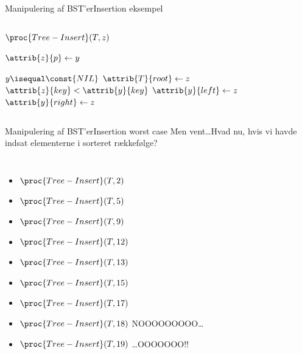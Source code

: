 \documentclass[aspectratio=1610]{beamer}
\begin{document}
\begin{frame}{Manipulering af BST'er}{Insertion eksempel}
\begin{columns}
\begin{block}{$\proc{Tree-Insert}(T,z)$}
\begin{codebox}
                \li $\attrib{z}{p} \gets y$ 

                \li \If $y \isequal \const{NIL}$ 
                    \Then
                \li     $\attrib{T}{root} \gets z$ 
                \li \ElseIf $\attrib{z}{key} < \attrib{y}{key}$ 
                    \Then
                \li     $\attrib{y}{left} \gets z$
                \li \Else $\attrib{y}{right} \gets z$
                    \End
            \end{codebox}
        \end{block}
        
    \end{columns}

\end{frame}

\begin{frame}{Manipulering af BST'er}{Insertion worst case}
    Men vent\ldots Hvad nu, hvis vi havde indsat elementerne i sorteret
    rækkefølge?

    \begin{columns}
        \small
        \begin{itemize}[<+(1)->]
            \item $\proc{Tree-Insert}(T,2)$
            \item $\proc{Tree-Insert}(T,5)$
            \item $\proc{Tree-Insert}(T,9)$
            \item $\proc{Tree-Insert}(T,12)$
            \item $\proc{Tree-Insert}(T,13)$
            \item $\proc{Tree-Insert}(T,15)$
            \item $\proc{Tree-Insert}(T,17)$
            \item $\proc{Tree-Insert}(T,18)$ \alert{NOOOOOOOOO\ldots}
            \item $\proc{Tree-Insert}(T,19)$ \alert{\ldots OOOOOOO!!}
        \end{itemize}
    

\end{columns}
\end{frame}
\end{document}
